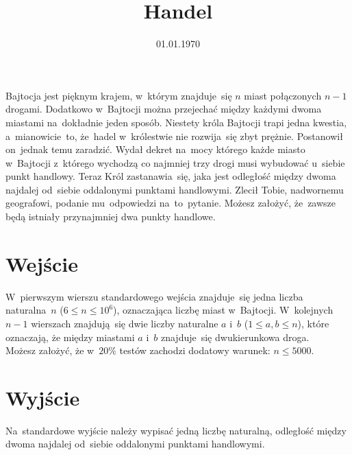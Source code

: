 \documentclass[zad]{soigstyl}
\date{01.01.1970}
\title{\mbox{Handel}}
\begin{document}
\begin{tasktext}%
    \noindent
    Bajtocja jest pięknym krajem, w~którym znajduje~się $n$ miast połączonych $n-1$ drogami. Dodatkowo w~Bajtocji można przejechać między każdymi dwoma miastami na~dokładnie jeden sposób. Niestety króla Bajtocji trapi jedna kwestia, a~mianowicie~to, że~hadel w~królestwie nie rozwija~się zbyt prężnie. Postanowił on~jednak temu zaradzić. Wydał dekret na~mocy którego każde miasto w~Bajtocji z~którego wychodzą co najmniej trzy drogi musi wybudować u~siebie punkt handlowy. Teraz Król zastanawia~się, jaka jest odległość między dwoma najdalej od~siebie oddalonymi punktami handlowymi. Zlecił Tobie, nadwornemu geografowi, podanie mu~odpowiedzi na~to~pytanie. Możesz założyć, że~zawsze będą istniały przynajmniej dwa punkty handlowe.
	
    	\section{Wejście}
	W~pierwszym wierszu standardowego wejścia znajduje~się jedna liczba naturalna~$n$ ($6 \leqslant n \leqslant 10^6$), oznaczająca liczbę miast w~Bajtocji. W~kolejnych $n-1$ wierszach znajdują~się dwie liczby naturalne $a$ i~$b$ ($1 \leqslant a, b \leqslant n$), które oznaczają, że między miastami $a$ i~$b$ znajduje~się dwukierunkowa droga.\\
Możesz założyć, że w~$20\%$ testów zachodzi dodatowy warunek: $n \leqslant 5000$.

	\section{Wyjście}
	Na~standardowe wyjście należy wypisać jedną liczbę naturalną, odległość między dwoma najdalej od~siebie oddalonymi punktami handlowymi.
	
	\oigprzyklady
\end{tasktext}
\end{document}
